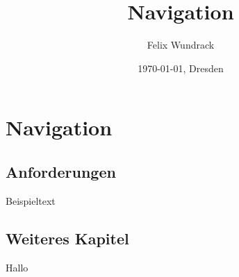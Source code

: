 \documentclass[../documentation.tex]{subfiles}
\title{Navigation}
\author{Felix Wundrack}
\date{\today{}, Dresden}
\begin{document}
\onlyinsubfile{\maketitle\tableofcontents}
\section{Navigation}

\subsection{Anforderungen}
\label{sec:anforderungen}

Beispieltext

\subsection{Weiteres Kapitel}
\label{sec:weitereskapitel}

Hallo
\end{document}
